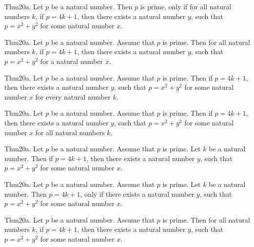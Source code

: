 \documentclass{article}
\begin{document}
Thm20a. Let $p$ be a natural number. Then $p$ is prime, only if for all natural numbers $k$, if $p = 4 k + 1$, then there exists a natural number $y$, such that $p = x ^{ 2}+ y ^{ 2}$ for some natural number $x$.

Thm20a. Let $p$ be a natural number. Assume that $p$ is prime. Then for all natural numbers $k$, if $p = 4 k + 1$, then there exists a natural number $y$, such that $p = x ^{ 2}+ y ^{ 2}$ for a natural number $x$.

Thm20a. Let $p$ be a natural number. Assume that $p$ is prime. Then if $p = 4 k + 1$, then there exists a natural number $y$, such that $p = x ^{ 2}+ y ^{ 2}$ for some natural number $x$ for every natural number $k$.

Thm20a. Let $p$ be a natural number. Assume that $p$ is prime. Then if $p = 4 k + 1$, then there exists a natural number $y$, such that $p = x ^{ 2}+ y ^{ 2}$ for some natural number $x$ for all natural numbers $k$.

Thm20a. Let $p$ be a natural number. Assume that $p$ is prime. Let $k$ be a natural number. Then if $p = 4 k + 1$, then there exists a natural number $y$, such that $p = x ^{ 2}+ y ^{ 2}$ for some natural number $x$.

Thm20a. Let $p$ be a natural number. Assume that $p$ is prime. Let $k$ be a natural number. Then $p = 4 k + 1$, only if there exists a natural number $y$, such that $p = x ^{ 2}+ y ^{ 2}$ for some natural number $x$.

Thm20a. Let $p$ be a natural number. Assume that $p$ is prime. Then for all natural numbers $k$, if $p = 4 k + 1$, then there exists a natural number $y$, such that $p = x ^{ 2}+ y ^{ 2}$ for some natural number $x$.
\end{document}
